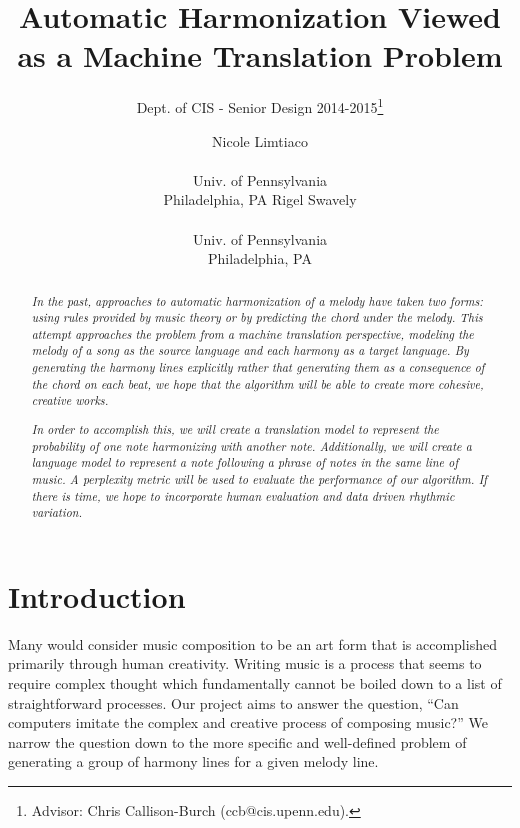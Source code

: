 \documentclass{sig-alternate}
\begin{document}
 

\title{Automatic Harmonization Viewed as a Machine Translation Problem}
\subtitle{Dept. of CIS - Senior Design 2014-2015\thanks{Advisor: Chris Callison-Burch (ccb@cis.upenn.edu).}}
\author{
\alignauthor Nicole Limtiaco \\  \\ Univ. of Pennsylvania \\ Philadelphia, PA
\alignauthor Rigel Swavely \\  \\ Univ. of Pennsylvania \\ Philadelphia, PA}
\date{}
\maketitle

\begin{abstract}
  \textit{In the past, approaches to automatic harmonization of a melody
  have taken two forms: using rules provided by music theory or by predicting
  the chord under the melody. This attempt approaches the problem from a machine translation perspective, 
  modeling the melody of a song as the source language and each harmony as a target language.
  By generating the harmony lines explicitly rather that generating them as a
  consequence of the chord on each beat, we hope that the algorithm will be able to create
  more cohesive, creative works.}

  \textit{In order to accomplish this, we will create a translation model to represent the probability
  of one note harmonizing with another note. Additionally, we will create a language model to represent
  a note following a phrase of notes in the same line of music. A perplexity metric will be used to 
  evaluate the performance of our algorithm. If there is time, we hope to incorporate human evaluation
  and data driven rhythmic variation.}
\end{abstract}

\section{Introduction}
\label{sec:intro}
Many would consider music composition to be an art form that is accomplished
primarily through human creativity. Writing music is a process that seems to require
complex thought which fundamentally cannot be boiled down to a list of straightforward
processes. Our project aims to answer the question, ``Can computers imitate the complex
and creative process of composing music?'' We narrow the question down to the more specific
and well-defined problem of generating a group of harmony lines for a given melody line.
\end{document}
